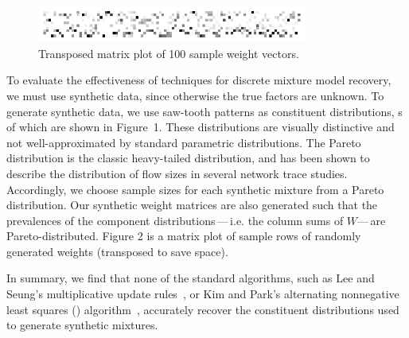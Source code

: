 \documentclass[conference]{IEEEtran}
\begin{document}
\begin{figure}[b]
\begin{center}
\includegraphics[width=3.5in]{synth/weights}
\end{center}
\vspace{-0.7em}
\caption{Transposed matrix plot of 100 sample weight vectors.}
\vspace{-0.5em}
\end{figure}

To evaluate the effectiveness of  techniques for discrete mixture model recovery, we must use synthetic data, since otherwise the true factors are unknown.
To generate synthetic data, we use saw-tooth patterns as constituent distributions, s of which are shown in Figure~1.
These distributions are visually distinctive and not well-approximated by standard parametric distributions.
The Pareto distribution is the classic heavy-tailed distribution, and has been shown to describe the distribution of flow sizes in several network trace studies.
Accordingly, we choose sample sizes for each synthetic mixture from a Pareto distribution.
Our synthetic weight matrices are also generated such that the prevalences of the component distributions\,---\,i.e. the column sums of $W$---\,are Pareto-distributed. Figure 2 is a matrix plot of sample rows of randomly generated weights (transposed to save space).

In summary, we find that none of the standard  algorithms, such as Lee and Seung's multiplicative update rules~\cite{Lee01}, or Kim and Park's alternating nonnegative least squares () algorithm~\cite{Kim08}, accurately recover the constituent distributions used to generate synthetic mixtures.



\end{document}

